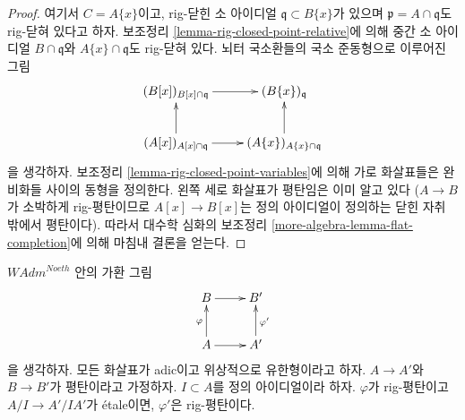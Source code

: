 \begin{proof}
\medskip\noindent
여기서 $C = A\{x\}$이고, rig-닫힌 소 아이디얼
$\mathfrak q \subset B\{x\}$가 있으며
$\mathfrak p = A \cap \mathfrak q$도 rig-닫혀 있다고 하자.
보조정리 \ref{lemma-rig-closed-point-relative}에 의해 중간 소 아이디얼
$B \cap \mathfrak q$와 $A\{x\} \cap \mathfrak q$도 rig-닫혀 있다.
뇌터 국소환들의 국소 준동형으로 이루어진 그림
$$
\xymatrix{
(B[x])_{B[x] \cap \mathfrak q} \ar[r] &
(B\{x\})_{\mathfrak q} \\
(A[x])_{A[x] \cap \mathfrak q} \ar[r] \ar[u] &
(A\{x\})_{A\{x\} \cap \mathfrak q} \ar[u]
}
$$
을 생각하자. 보조정리 \ref{lemma-rig-closed-point-variables}에 의해
가로 화살표들은 완비화들 사이의 동형을 정의한다.
왼쪽 세로 화살표가 평탄임은 이미 알고 있다
($A \to B$가 소박하게 rig-평탄이므로
$A[x] \to B[x]$는 정의 아이디얼이 정의하는 닫힌 자취 밖에서 평탄이다).
따라서 대수학 심화의 보조정리
\ref{more-algebra-lemma-flat-completion}에 의해 마침내 결론을 얻는다.
\end{proof}

\begin{lemma}
\label{lemma-rig-flat-local-etale}
$\textit{WAdm}^{Noeth}$ 안의 가환 그림
$$
\xymatrix{
B \ar[r] & B' \\
A \ar[r] \ar[u]^\varphi & A' \ar[u]_{\varphi'}
}
$$
을 생각하자. 모든 화살표가 adic이고 위상적으로 유한형이라고 하자.
$A \to A'$와 $B \to B'$가 평탄이라고 가정하자.
$I \subset A$를 정의 아이디얼이라 하자.
$\varphi$가 rig-평탄이고 $A/I \to A'/IA'$가 \'etale이면,
$\varphi'$은 rig-평탄이다.
\end{lemma}

